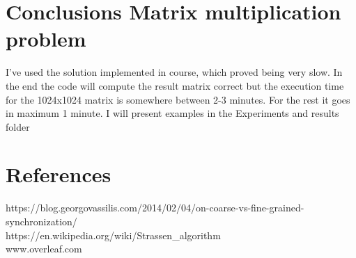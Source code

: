 \documentclass[14pt]{article}
\begin{document}
\section*{Conclusions Matrix multiplication problem}
\vspace{10 mm}
I've used the solution implemented in course, which proved being very slow. In the end the code will compute the result matrix correct but the execution time for the 1024x1024 matrix is somewhere between 2-3 minutes. For the rest it goes in maximum 1 minute. I will present examples in the Experiments and results folder
\section*{References}
https://blog.georgovassilis.com/2014/02/04/on-coarse-vs-fine-grained-synchronization/\\
https://en.wikipedia.org/wiki/Strassen_algorithm\\
www.overleaf.com\\
\end{document}
